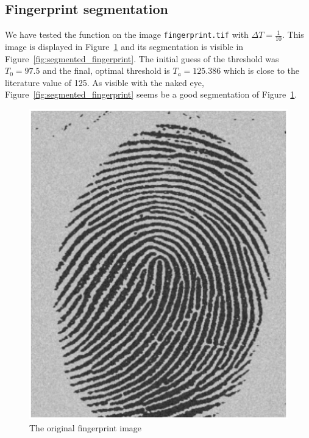 \subsection{Fingerprint segmentation}
We have tested the function on the image \texttt{fingerprint.tif} with \(\Delta T = \frac{1}{10}\). 
This image is displayed in Figure~\ref{fig:original_fingerprint} and its segmentation is visible in Figure~\ref{fig:segmented_fingerprint}.
The initial guess of the threshold was \(T_0 = 97.5\) and the final, optimal threshold is \(T_a = 125.386\) which is close to the literature value of 125.\cite[p. 742]{gonzalez2002digital}
As visible with the naked eye, Figure~\ref{fig:segmented_fingerprint} seems be a good segmentation of Figure~\ref{fig:original_fingerprint}.
\begin{figure}[htb]
 \centering
 \includegraphics[width=\linewidth]{original_fingerprint.eps}
 \caption{The original fingerprint image}
 \label{fig:original_fingerprint}
\end{figure}

